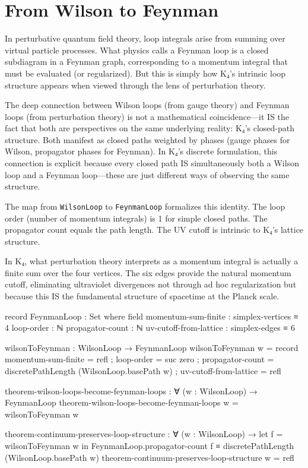 \documentclass[11pt,a4paper]{book}
\begin{document}
\section{From Wilson to Feynman}

In perturbative quantum field theory, loop integrals arise from summing over virtual particle processes. What physics calls a Feynman loop is a closed subdiagram in a Feynman graph, corresponding to a momentum integral that must be evaluated (or regularized). But this is simply how K₄'s intrinsic loop structure appears when viewed through the lens of perturbation theory.

The deep connection between Wilson loops (from gauge theory) and Feynman loops (from perturbation theory) is not a mathematical coincidence—it IS the fact that both are perspectives on the same underlying reality: K₄'s closed-path structure. Both manifest as closed paths weighted by phases (gauge phases for Wilson, propagator phases for Feynman). In K₄'s discrete formulation, this connection is explicit because every closed path IS simultaneously both a Wilson loop and a Feynman loop—these are just different ways of observing the same structure.

The map from \texttt{WilsonLoop} to \texttt{FeynmanLoop} formalizes this identity. The loop order (number of momentum integrals) is 1 for simple closed paths. The propagator count equals the path length. The UV cutoff is intrinsic to K₄'s lattice structure.

In K₄, what perturbation theory interprets as a momentum integral is actually a finite sum over the four vertices. The six edges provide the natural momentum cutoff, eliminating ultraviolet divergences not through ad hoc regularization but because this IS the fundamental structure of spacetime at the Planck scale.

\begin{code}
record FeynmanLoop : Set where
  field
    momentum-sum-finite    : simplex-vertices ≡ 4
    loop-order             : ℕ
    propagator-count       : ℕ
    uv-cutoff-from-lattice : simplex-edges ≡ 6

wilsonToFeynman : WilsonLoop → FeynmanLoop
wilsonToFeynman w = record
  { momentum-sum-finite    = refl
  ; loop-order             = suc zero
  ; propagator-count       = discretePathLength (WilsonLoop.basePath w)
  ; uv-cutoff-from-lattice = refl
  }

theorem-wilson-loops-become-feynman-loops : ∀ (w : WilsonLoop) →
  FeynmanLoop
theorem-wilson-loops-become-feynman-loops w = wilsonToFeynman w

theorem-continuum-preserves-loop-structure : 
  ∀ (w : WilsonLoop) → 
  let f = wilsonToFeynman w in
  FeynmanLoop.propagator-count f ≡ discretePathLength (WilsonLoop.basePath w)
theorem-continuum-preserves-loop-structure w = refl
\end{code}
\end{document}
